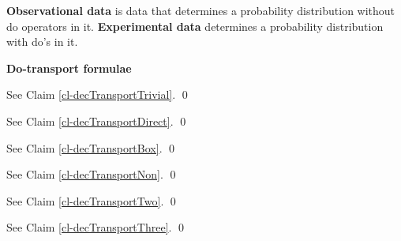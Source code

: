 {\bf Observational data} is data that
determines a probability distribution
without do operators in it.
 {\bf Experimental data} 
determines a probability distribution
 with do's in it.




{\bf Do-transport formulae}

\begin{claim}
\decTransportTrivial
\end{claim}
\proof
See Claim \ref{cl-decTransportTrivial}.
\qed


\begin{claim}
\decTransportDirect
\end{claim}
\proof
See Claim \ref{cl-decTransportDirect}.
\qed


\begin{claim}
\decTransportBox
\end{claim}
\proof
See Claim 
\ref{cl-decTransportBox}.
\qed



\begin{claim}
\decTransportNon
\end{claim}
\proof
See Claim 
\ref{cl-decTransportNon}.
\qed

\begin{claim}
\decTransportTwo
\end{claim}
\proof
See Claim \ref{cl-decTransportTwo}.
\qed

\begin{claim}
\decTransportThree
\end{claim}
\proof
See Claim \ref{cl-decTransportThree}.
\qed